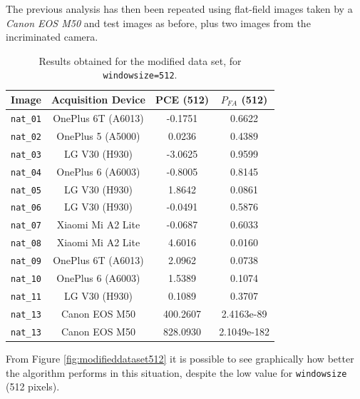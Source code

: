 \documentclass[a4paper, 11pt]{article}
\begin{document}
The previous analysis has then been repeated using flat-field images taken by a \textit{Canon EOS M50} and test images as before, plus two images from the incriminated camera.

\begin{table}[H]
	\centering	
	\begin{tabular}{c|c|c|c}
		Image			 & Acquisition Device	& PCE (512)	& $P_{FA}$ (512) \\
		\toprule
		\texttt{nat\_01} & OnePlus 6T (A6013)	& -0.1751	& 0.6622 \\
		\texttt{nat\_02} & OnePlus 5 (A5000) 	& 0.0236	& 0.4389 \\
		\texttt{nat\_03} & LG V30 (H930) 		& -3.0625	& 0.9599 \\
		\texttt{nat\_04} & OnePlus 6 (A6003) 	& -0.8005	& 0.8145 \\
		\texttt{nat\_05} & LG V30 (H930) 		& 1.8642	& 0.0861 \\
		\texttt{nat\_06} & LG V30 (H930) 		& -0.0491	& 0.5876 \\
		\texttt{nat\_07} & Xiaomi Mi A2 Lite	& -0.0687	& 0.6033 \\
		\texttt{nat\_08} & Xiaomi Mi A2 Lite 	& 4.6016	& 0.0160 \\
		\texttt{nat\_09} & OnePlus 6T (A6013)	& 2.0962 	& 0.0738 \\
		\texttt{nat\_10} & OnePlus 6 (A6003) 	& 1.5389	& 0.1074 \\
		\texttt{nat\_11} & LG V30 (H930) 		& 0.1089	& 0.3707 \\
		\texttt{nat\_13} & Canon EOS M50		& 400.2607	& 2.4163e-89 \\
		\texttt{nat\_13} & Canon EOS M50		& 828.0930	& 2.1049e-182
	\end{tabular}
	\caption{Results obtained for the modified data set, for \texttt{windowsize=512}.}
	\label{tab:modifieddataset}
\end{table}

From Figure \ref{fig:modifieddataset512} it is possible to see graphically how better the algorithm performs in this situation, despite the low value for \texttt{windowsize} (512 pixels).
\end{document}
